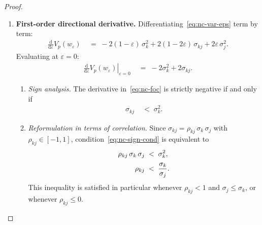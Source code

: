 \documentclass[12pt,openany]{book}
\newcommand{\bfw}{\mathbf{w}}
\numberwithin{equation}{chapter}
\theoremstyle{plain}
\theoremstyle{definition}
\theoremstyle{remark}
\def\bfw{w}%
\begin{document}
\begin{proof}
\begin{enumerate}
  \item \textbf{First-order directional derivative.}
        Differentiating~\eqref{eq:nc-var-eps} term by term:
        \begin{align}
          \frac{\mathrm{d}}{\mathrm{d}\varepsilon}
          V_p(\bfw_\varepsilon)
          &\;=\;
            -2(1-\varepsilon)\,\sigma_k^2
            + 2(1-2\varepsilon)\,\sigma_{kj}
            + 2\varepsilon\,\sigma_j^2.
          \label{eq:nc-deriv-full}
        \end{align}
        Evaluating at $\varepsilon = 0$:
        \begin{align}
          \left.\frac{\mathrm{d}}{\mathrm{d}\varepsilon}
          V_p(\bfw_\varepsilon)\right|_{\varepsilon=0}
          &\;=\; -2\sigma_k^2 + 2\sigma_{kj}.
          \label{eq:nc-foc}
        \end{align}
        \begin{enumerate}
          \item \emph{Sign analysis.}
                The derivative in~\eqref{eq:nc-foc} is strictly
                negative if and only if
                \begin{align}
                  \sigma_{kj} &\;<\; \sigma_k^2.
                  \label{eq:nc-sign-cond}
                \end{align}
          \item \emph{Reformulation in terms of correlation.}
                Since $\sigma_{kj} = \rho_{kj}\,\sigma_k\,\sigma_j$
                with $\rho_{kj} \in [-1,1]$,
                condition~\eqref{eq:nc-sign-cond} is equivalent to
                \begin{align}
                  \rho_{kj}\,\sigma_k\,\sigma_j &\;<\; \sigma_k^2,
                  \notag\\[2pt]
                  \rho_{kj} &\;<\; \frac{\sigma_k}{\sigma_j}.
                  \label{eq:nc-corr-cond}
                \end{align}
                This inequality is satisfied in particular whenever
                $\rho_{kj} < 1$ and $\sigma_j \leq \sigma_k$,
                or whenever $\rho_{kj} \leq 0$.
        \end{enumerate}


\end{enumerate}
\end{proof}
\end{document}
